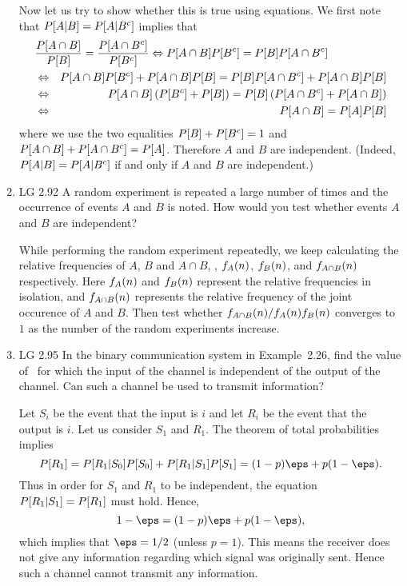 \begin{enumerate}
\begin{solution}
		\newcommand{\A}{\pr{A\cap B}}
		\newcommand{\B}{\pr{B}}
		\newcommand{\C}{\pr{A\cap \comp{B}}}
		\newcommand{\D}{\pr{\comp{B}}}
		Now let us try to show whether this is true
		using equations.
		We first note that $P[A|B] = P[A|{B}^c]$ implies
		that
		\begin{eqnarray*}
			\lefteqn{
			\cpreq{A}{B} = \cpreq{A}{\comp{B}}
			\Leftrightarrow \A \D = \B \C
			}
			\\&\Leftrightarrow& \A \D + \A \B  = \B \C + \A \B
			\\&\Leftrightarrow& \A \left( \D + \B \right)  = \B \left( \C + \A  \right)
			\\&\Leftrightarrow& \pr{A\cap B} = \pr{A} \pr{B}
		\end{eqnarray*}
		where we use the two equalities
		$P[B] + P[{B}^c] = 1$
		and $P[A\cap B] + P[A \cap {B}^c] = P[A]$.
		Therefore $A$ and $B$ are independent.
		(Indeed, $P[A|B] = P[A|{B}^c]$ if and only if $A$ and $B$ are independent.)
	\end{solution}
	\fi

	\item LG 2.92
	\ifdefined\sol
	A random experiment is repeated a large number of times
	and the occurrence of events $A$ and $B$ is noted.
	How would you test whether events $A$ and $B$ are independent?
	\begin{solution}
		While performing the random experiment repeatedly,
		we keep calculating the relative frequencies of $A$, $B$ and $A\cap B$,
		\ie,
		$f_{A}(n)$,
		$f_{B}(n)$,
		and $f_{A\cap B}(n)$ respectively.
		Here $f_{A}(n)$ and $f_{B}(n)$ represent the relative frequencies in isolation,
		and $f_{A\cap B}(n)$ represents the relative frequency of the joint occurence of $A$ and $B$.
		Then test whether $f_{A\cap B}(n)/f_{A}(n) f_{B}(n)$
		converges to $1$ as the number of the random experiments increase.
	\end{solution}
	\fi


	\item LG 2.95
	\ifdefined\sol
	In the binary communication system in Example~2.26,
	find the value of \eps\ for which the input of the channel
	is independent of the output of the channel.
	Can such a channel be used to transmit information?
	\begin{solution}
	Let $S_i$ be the event that the input is $i$
	and let $R_i$ be the event that the output is $i$.
	Let us consider $S_1$ and $R_1$.
	The theorem of total probabilities
	implies
	\[
		\pr{R_1} = \cpr{R_1}{S_0}\pr{S_0} + \cpr{R_1}{S_1} \pr{S_1}
		 = (1-p) \eps + p (1-\eps).
	\]
	Thus in order for $S_1$ and $R_1$ to be independent,
	the equation $P[R_1|S_1] = P[R_1]$ must hold.
	Hence,
	\[
		1-\eps = (1-p) \eps + p (1-\eps),
	\]
	which implies that $\eps = 1/2$ (unless $p=1$).
	This means the receiver does not give any information regarding
	which signal was originally sent.
	Hence such a channel cannot transmit any information.
	\end{solution}
	\fi


\end{enumerate}
